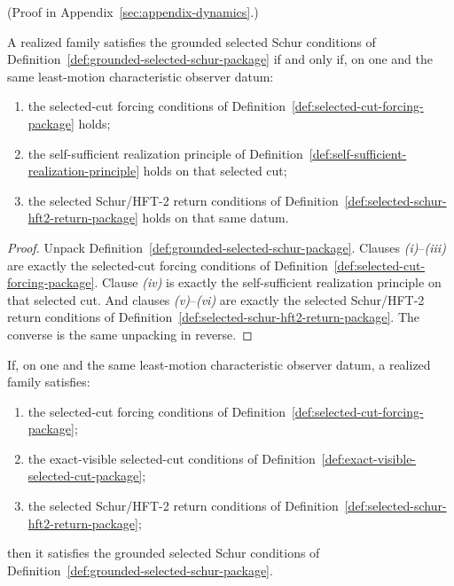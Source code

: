 (Proof in Appendix~\ref{sec:appendix-dynamics}.)

\begin{theorem}
\label{thm:grounded-selected-schur-package-splits-into-three-layers}
A realized family satisfies the grounded selected Schur conditions of
Definition~\ref{def:grounded-selected-schur-package} if and only if, on one and
the same least-motion characteristic observer datum:
\begin{enumerate}[label=(\alph*), leftmargin=2em, itemsep=0.2em]
\item the selected-cut forcing conditions of
      Definition~\ref{def:selected-cut-forcing-package} holds;
\item the self-sufficient realization principle of
      Definition~\ref{def:self-sufficient-realization-principle} holds on that
      selected cut;
\item the selected Schur/HFT-2 return conditions of
      Definition~\ref{def:selected-schur-hft2-return-package} holds on that
      same datum.
\end{enumerate}
\end{theorem}

\begin{proof}
Unpack Definition~\ref{def:grounded-selected-schur-package}. Clauses
\emph{(i)}--\emph{(iii)} are exactly the selected-cut forcing conditions of
Definition~\ref{def:selected-cut-forcing-package}. Clause \emph{(iv)} is
exactly the self-sufficient realization principle on that selected cut. And
clauses \emph{(v)}--\emph{(vi)} are exactly the selected Schur/HFT-2 return
conditions of
Definition~\ref{def:selected-schur-hft2-return-package}. The converse is the
same unpacking in reverse.
\end{proof}

\begin{corollary}
\label{cor:selected-cut-plus-exact-visible-plus-schur-return-forces-grounded-package}
If, on one and the same least-motion characteristic observer datum, a realized
family satisfies:
\begin{enumerate}[label=(\alph*), leftmargin=2em, itemsep=0.2em]
\item the selected-cut forcing conditions of
      Definition~\ref{def:selected-cut-forcing-package};
\item the exact-visible selected-cut conditions of
      Definition~\ref{def:exact-visible-selected-cut-package};
\item the selected Schur/HFT-2 return conditions of
      Definition~\ref{def:selected-schur-hft2-return-package};
\end{enumerate}
then it satisfies the grounded selected Schur conditions of
Definition~\ref{def:grounded-selected-schur-package}.
\end{corollary}

